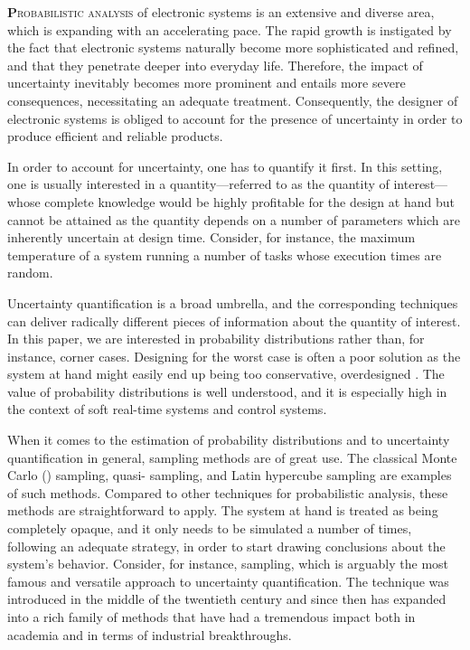 \lettrine[findent=0.4em, nindent=0em]{\textbf{P}}{robabilistic analysis} of
electronic systems is an extensive and diverse area, which is expanding with an
accelerating pace. The rapid growth is instigated by the fact that electronic
systems naturally become more sophisticated and refined, and that they penetrate
deeper into everyday life. Therefore, the impact of uncertainty inevitably
becomes more prominent and entails more severe consequences, necessitating an
adequate treatment. Consequently, the designer of electronic systems is obliged
to account for the presence of uncertainty in order to produce efficient and
reliable products.

In order to account for uncertainty, one has to quantify it first. In this
setting, one is usually interested in a quantity---referred to as the quantity
of interest---whose complete knowledge would be highly profitable for the design
at hand but cannot be attained as the quantity depends on a number of parameters
which are inherently uncertain at design time. Consider, for instance, the
maximum temperature of a system running a number of tasks whose execution times
are random.

Uncertainty quantification is a broad umbrella, and the corresponding techniques
can deliver radically different pieces of information about the quantity of
interest. In this paper, we are interested in probability distributions rather
than, for instance, corner cases. Designing for the worst case is often a poor
solution as the system at hand might easily end up being too conservative,
overdesigned \cite{quinton2012}. The value of probability distributions is well
understood, and it is especially high in the context of soft real-time systems
and control systems.

When it comes to the estimation of probability distributions and to uncertainty
quantification in general, sampling methods are of great use. The classical
Monte Carlo () sampling, quasi- sampling, and Latin hypercube
sampling are examples of such methods. Compared to other techniques for
probabilistic analysis, these methods are straightforward to apply. The system
at hand is treated as being completely opaque, and it only needs to be simulated
a number of times, following an adequate strategy, in order to start drawing
conclusions about the system's behavior. Consider, for instance, 
sampling, which is arguably the most famous and versatile approach to
uncertainty quantification. The technique was introduced in the middle of the
twentieth century and since then has expanded into a rich family of methods that
have had a tremendous impact both in academia and in terms of industrial
breakthroughs.

